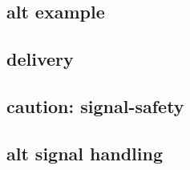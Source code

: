 \subsection{alt example}


\subsection{delivery}



\subsection{caution: signal-safety}



\subsection{alt signal handling}



